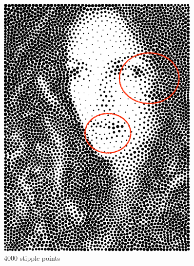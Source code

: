 \documentclass[11pt]{article}
\begin{document}
\begin{figure}[htbp]
\begin{minipage}[t]{0.48\textwidth}
\includegraphics[width = 0.9\textwidth]{faireyes_vor_4000.png}
\caption{4000 stipple points}
\end{minipage}
\end{figure}
\end{document}
